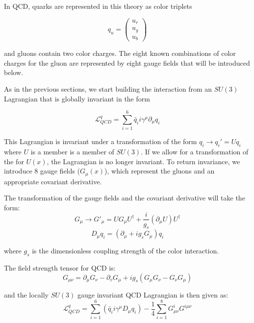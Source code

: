 In QCD, quarks are represented in this theory as color triplets

	\begin{equation}
	q_{u} = 
	\begin{pmatrix}
		u_{r} \\
		u_{g}\\
		u_{b}
	\end{pmatrix}
	\end{equation}

and gluons contain two color charges. The eight known combinations of color charges for the gluon are represented by eight gauge fields that will be introduced below.

As in the previous sections, we start building the interaction from an $SU(3)$ Lagrangian that is globally invariant in the form

	\begin{equation}
	\mathcal{L}^{q}_{QCD} = \sum_{i=1}^{6}\bar{q}_{i}i\gamma^{\mu}\partial_{\mu}q_{i}
	\end{equation}

This Lagrangian is invariant under a transformation of the form $q_{i}\rightarrow q_{i}' = Uq_{i}$ where $U$ is a member is a member of $SU(3)$. If we allow for a transformation of the for $U(x)$, the Lagrangian is no longer invariant. To return invariance, we introduce 8 gauge fields ($G_{\mu}(x)$), which represent the gluons and an appropriate covariant derivative.
	
The transformation of the gauge fields and the covariant derivative will take the form:
		\begin{equation}
		G_{\mu}\rightarrow G'_{\mu} = UG_{\mu}U^{\dagger}+\frac{i}{g_{s}}(\partial_{\mu}U)U^{\dagger}
		\end{equation}
		\begin{equation}
		D_{\mu}q_{i} = (\partial_{\mu}+ig_{s}G_{\mu})q_{i}
		\end{equation}
		
where $g_{s}$ is the dimensionless coupling strength of the color interaction.

The field strength tensor for QCD is:
		\begin{equation}
		G_{\mu\nu} = \partial_{\mu}G_{\nu} - \partial_{v}G_{\mu} + ig_{s}(G_{\mu}G_{\nu} - G_{\nu}G_{\mu})
		\end{equation}

and the locally $SU(3)$ gauge invariant QCD Lagrangian is then given as:
		\begin{equation}
		\mathcal{L}^{q}_{QCD} = \sum_{i=1}^{6}(\bar{q}_{i}i\gamma^{\mu}D_{\mu}q_{i})-\frac{1}{4}\sum_{i=1}^{8}G_{\mu\nu}^{i}G^{i\mu\nu}
		\end{equation}

